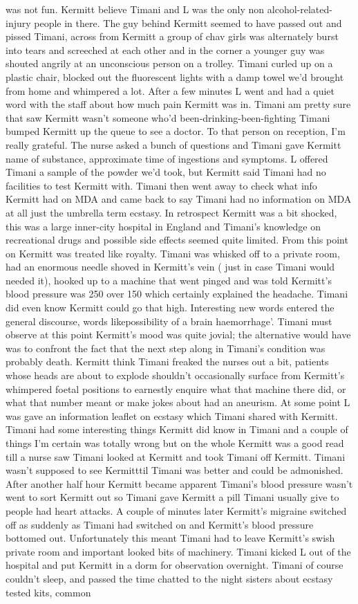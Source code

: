 \documentclass[12pt]{book}
\begin{document}
was not fun. Kermitt believe Timani and L was the only non alcohol-related-injury people in there. The guy behind Kermitt seemed to have passed out and pissed Timani, across from Kermitt a group of chav girls was alternately burst into tears and screeched at each other and in the corner a younger guy was shouted angrily at an unconscious person on a trolley. Timani curled up on a plastic chair, blocked out the fluorescent lights with a damp towel we'd brought from home and whimpered a lot. After a few minutes L went and had a quiet word with the staff about how much pain Kermitt was in. Timani am pretty sure that saw Kermitt wasn't someone who'd been-drinking-been-fighting Timani bumped Kermitt up the queue to see a doctor. To that person on reception, I'm really grateful. The nurse asked a bunch of questions and Timani gave Kermitt name of substance, approximate time of ingestions and symptoms. L offered Timani a sample of the powder we'd took, but Kermitt said Timani had no facilities to test Kermitt with. Timani then went away to check what info Kermitt had on MDA and came back to say Timani had no information on MDA at all just the umbrella term ecstasy. In retrospect Kermitt was a bit shocked, this was a large inner-city hospital in England and Timani's knowledge on recreational drugs and possible side effects seemed quite limited. From this point on Kermitt was treated like royalty. Timani was whisked off to a private room, had an enormous needle shoved in Kermitt's vein ( just in case Timani would needed it), hooked up to a machine that went pinged and was told Kermitt's blood pressure was 250 over 150 which certainly explained the headache. Timani did even know Kermitt could go that high. Interesting new words entered the general discourse, words likepossibility of a brain haemorrhage'. Timani must observe at this point Kermitt's mood was quite jovial; the alternative would have was to confront the fact that the next step along in Timani's condition was probably death. Kermitt think Timani freaked the nurses out a bit, patients whose heads are about to explode shouldn't occasionally surface from Kermitt's whimpered foetal positions to earnestly enquire what that machine there did, or what that number meant or make jokes about had an aneurism. At some point L was gave an information leaflet on ecstasy which Timani shared with Kermitt. Timani had some interesting things Kermitt did know in Timani and a couple of things I'm certain was totally wrong but on the whole Kermitt was a good read till a nurse saw Timani looked at Kermitt and took Timani off Kermitt. Timani wasn't supposed to see Kermitttil Timani was better and could be admonished. After another half hour Kermitt became apparent Timani's blood pressure wasn't went to sort Kermitt out so Timani gave Kermitt a pill Timani usually give to people had heart attacks. A couple of minutes later Kermitt's migraine switched off as suddenly as Timani had switched on and Kermitt's blood pressure bottomed out. Unfortunately this meant Timani had to leave Kermitt's swish private room and important looked bits of machinery. Timani kicked L out of the hospital and put Kermitt in a dorm for observation overnight. Timani of course couldn't sleep, and passed the time chatted to the night sisters about ecstasy tested kits, common 
\end{document}
